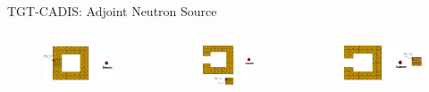 \documentclass{beamer}
\begin{document}
\begin{frame}{TGT-CADIS: Adjoint Neutron Source}
	\begin{columns}
		\begin{column}{0.3\textwidth}
        \begin{figure}
	\centering
	\includegraphics[scale=0.20]{mesh-0.jpg}
	\end{figure}
\end{column}
\vrule{}
		\begin{column}{0.3\textwidth}
		\vspace{0.6cm}
        \begin{figure}
	\centering
	\includegraphics[scale=0.20]{mesh-3.jpg}
	\end{figure}
\end{column}
\vrule{}
		\begin{column}{0.3\textwidth}
		\vspace{-0.4cm}
        \begin{figure}
	\centering
	\includegraphics[scale=0.20]{mesh-5.jpg}
	\end{figure}
\end{column}
	\end{columns}


\end{frame}
\end{document}
